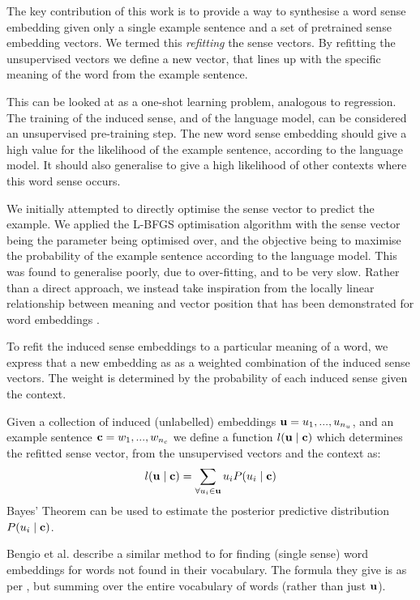 {The key contribution of this work is to provide a way to synthesise a word sense embedding given only a single example sentence and a set of pretrained sense embedding vectors. 
We termed this \emph{refitting} the sense vectors.
By refitting the unsupervised vectors we define a new vector, that lines up with the specific meaning of the word from the example sentence.

This can be looked at as a one-shot learning problem, analogous to regression.
The training of the induced sense, and of the language model, can be considered an unsupervised pre-training step.
The new word sense embedding should give a high value for the likelihood of the example sentence, according to the language model.
It should also generalise to give a high likelihood of other contexts where this word sense occurs.

We initially attempted to directly optimise the sense vector to predict the example.
We applied the L-BFGS \parencite{nocedal1980updating} optimisation algorithm with the sense vector being the parameter being optimised over, and the objective being to maximise the probability of the example sentence according to the language model.
This was found to generalise poorly, due to over-fitting, and to be very slow.
Rather than a direct approach, we instead take inspiration from the locally linear relationship between meaning and vector position that has been demonstrated for word embeddings \parencite{mikolov2013efficient,mikolovSkip,mikolov2013linguisticsubstructures}.

To refit the induced sense embeddings to a particular meaning of a word, we express that a new embedding as as a weighted combination of the induced sense vectors.
The weight is determined by the probability of each induced sense given the context.

Given a collection of induced (unlabelled) embeddings $\mathbf{u}={u_1,...,u_{n_u}}$, and an example sentence $\mathbf{c}={w_1,...,w_{n_c}}$ we define a function $l(\mathbf{u} \mid \mathbf{c} )$ which determines the refitted sense vector, from the unsupervised vectors and the context as:
\begin{equation} \label{eq:synth}
l(\mathbf{u} \mid \mathbf{c} ) = \sum_{\forall u_i \in \mathbf{u}} u_i P(u_i \mid \mathbf{c})
\end{equation}
Bayes' Theorem can be used to estimate the posterior predictive distribution $P(u_i \mid \mathbf{c})$.

Bengio et al. \parencite{NPLM} describe a similar method to  for finding  (single sense) word embeddings for words not found in their vocabulary.
The formula they give is as per , but summing over the entire vocabulary of words (rather than just $\mathbf{u}$).


}
